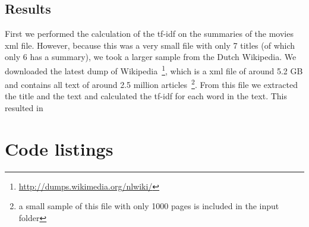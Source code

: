 \documentclass[11pt]{article}
\begin{document}
\subsection{Results}
First we performed the calculation of the tf-idf on the summaries of the movies xml file. However, because this was a very small file with only 7 titles (of which only 6 has a summary), we took a larger sample from the Dutch Wikipedia. We downloaded the latest dump of Wikipedia~\footnote{\url{http://dumps.wikimedia.org/nlwiki/}}, which is a xml file of around 5.2 GB and contains all text of around 2.5 million articles~\footnote{a small sample of this file with only 1000 pages is included in the input folder}. From this file we extracted the title and the text and calculated the tf-idf for each word in the text. This resulted in 



\section{Code listings}





\end{document}
